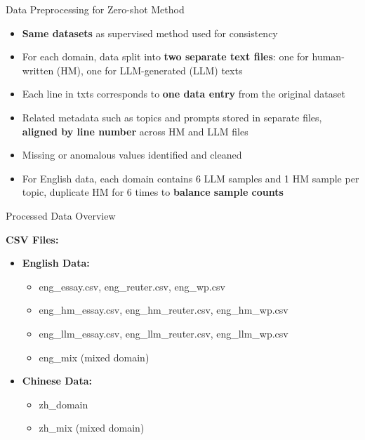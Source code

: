 \documentclass[lettersize,journal]{IEEEtran}
\begin{document}
Data Preprocessing for Zero-shot Method

\begin{itemize}
  \item \textbf{Same datasets} as supervised method used for consistency
  \item For each domain, data split into \textbf{two separate text files}: one for human-written (HM), one for LLM-generated (LLM) texts
  \item Each line in txts corresponds to \textbf{one data entry} from the original dataset
  \item Related metadata such as topics and prompts stored in separate files, \textbf{aligned by line number} across HM and LLM files
  \item Missing or anomalous values identified and cleaned 
  \item For English data, each domain contains 6 LLM samples and 1 HM sample per topic, duplicate HM for 6 times to \textbf{balance sample counts}
\end{itemize}



Processed Data Overview


\textbf{CSV Files:}
\begin{itemize}
  \item \textbf{English Data:}
  \begin{itemize}
    \item eng\_essay.csv, eng\_reuter.csv, eng\_wp.csv
    \item eng\_hm\_essay.csv, eng\_hm\_reuter.csv, eng\_hm\_wp.csv
    \item eng\_llm\_essay.csv, eng\_llm\_reuter.csv, eng\_llm\_wp.csv
    \item eng\_mix (mixed domain)
  \end{itemize}
  \item \textbf{Chinese Data:}
  \begin{itemize}
    \item zh\_domain
    \item zh\_mix (mixed domain)
  \end{itemize}
\end{itemize}
\end{document}
